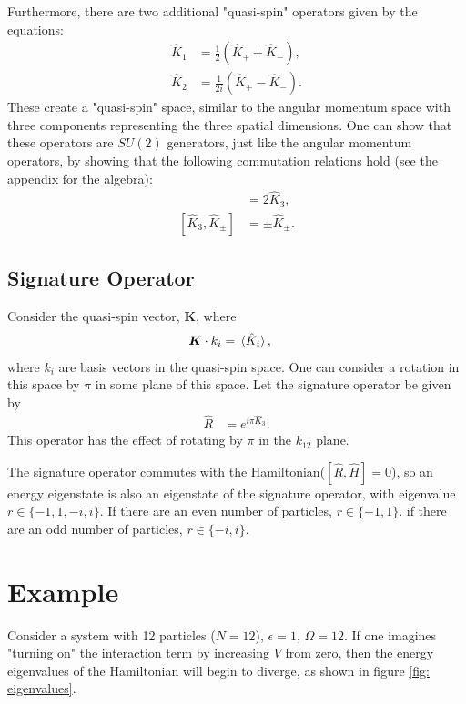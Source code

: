 \documentclass[
a4paper,
10pt,
twoside,
]{article}
\begin{document}
Furthermore, there are two additional "quasi-spin" operators given by the equations:
\begin{align}
	\hat{K}_1 &= \frac{1}{2}(\hat{K}_+ + \hat{K}_-),\\
	\hat{K}_2 &= \frac{1}{2i}(\hat{K}_+ - \hat{K}_-).
\end{align}
These create a "quasi-spin" space, similar to the angular momentum space with three components representing the three spatial dimensions.
One can show that these operators are $SU(2)$ generators, just like the angular momentum operators, by showing that the following commutation relations hold (see the appendix for the algebra):
\begin{align}
	[\hat{K}_+,\hat{K}_-] &= 2\hat{K}_3,\\
	[\hat{K}_3,\hat{K}_\pm] &= \pm\hat{K}_\pm.
\end{align}

\subsection{Signature Operator}\label{ssec: IB}


Consider the quasi-spin vector, $\bm{K}$, where
\begin{align}
	\bm{K}\cdot k_i &= \ev*{\hat{K}_i},
\end{align}
where $k_i$ are basis vectors in the quasi-spin space.
One can consider a rotation in this space by $\pi$ in some plane of this space.
Let the signature operator be given by
\begin{align}
	\hat{R} &= e^{i\pi\hat{K}_3}.
\end{align}
This operator has the effect of rotating by $\pi$ in the $k_{12}$ plane.

The signature operator commutes with the Hamiltonian($[\hat{R},\hat{H}]=0$), so an energy eigenstate is also an eigenstate of the signature operator, with eigenvalue $r \in \{-1,1,-i,i\}$.
If there are an even number of particles, $r\in\{-1,1\}$.
if there are an odd number of particles, $r\in\{-i,i\}$.


\section{Example}\label{sec: III}

Consider a system with 12 particles ($N=12$), $\epsilon = 1$, $\Omega = 12$.
If one imagines "turning on" the interaction term by increasing $V$ from zero, then the energy eigenvalues of the Hamiltonian will begin to diverge, as shown in figure \ref{fig: eigenvalues}.
\end{document}
